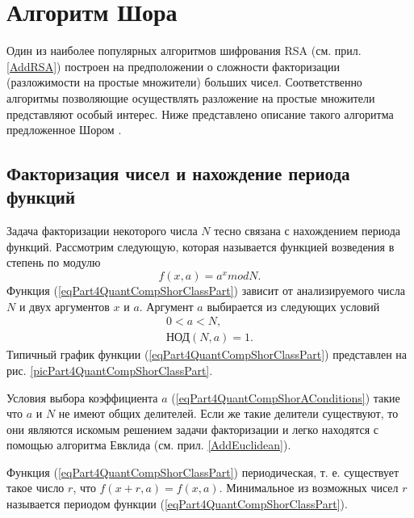 \section{Алгоритм Шора}
\label{Part4QuantCompShor}
Один из наиболее популярных алгоритмов шифрования RSA (см. 
прил. \ref{AddRSA}) построен на предположении о сложности факторизации
(разложимости на простые множители) больших чисел. Соответственно
алгоритмы позволяющие осуществлять разложение на простые множители
представляют особый интерес. Ниже представлено описание такого
алгоритма предложенное Шором \cite{bShor94}.

\subsection{Факторизация чисел и нахождение периода функций}
Задача факторизации некоторого числа $N$ тесно связана с нахождением периода
функций. Рассмотрим следующую, которая называется функцией возведения
в степень по модулю
\begin{equation}
f\left(x, a\right) = a^x mod N.
\label{eqPart4QuantCompShorClassPart}
\end{equation}
Функция (\ref{eqPart4QuantCompShorClassPart}) зависит от
анализируемого числа $N$ и двух аргументов $x$ и $a$. Аргумент $a$
выбирается из следующих условий
\begin{eqnarray}
0 < a < N,
\nonumber \\
\mbox{НОД}\left(N, a\right) = 1.
\label{eqPart4QuantCompShorAConditions}
\end{eqnarray}
Типичный график функции (\ref{eqPart4QuantCompShorClassPart}) представлен на
рис. \ref{picPart4QuantCompShorClassPart}.




Условия выбора коэффициента $a$
(\ref{eqPart4QuantCompShorAConditions}) такие что $a$ и $N$ не имеют
общих делителей. Если же такие делители существуют, то они являются
искомым решением задачи факторизации и легко находятся с помощью
алгоритма Евклида (см. прил. \ref{AddEuclidean}).

Функция (\ref{eqPart4QuantCompShorClassPart}) периодическая,
т. е. существует такое число $r$, что $f\left(x + r, a\right) = 
f\left(x, a\right)$. Минимальное из возможных чисел $r$ называется
периодом функции (\ref{eqPart4QuantCompShorClassPart}). 

